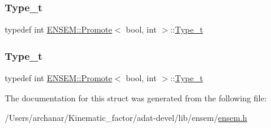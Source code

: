 \subsubsection{\texorpdfstring{Type\_t}{Type\_t}\hspace{0.1cm}{\footnotesize\ttfamily [2/3]}}
{\footnotesize\ttfamily typedef int \mbox{\hyperlink{structENSEM_1_1Promote}{E\+N\+S\+E\+M\+::\+Promote}}$<$ bool, int $>$\+::\mbox{\hyperlink{structENSEM_1_1Promote_3_01bool_00_01int_01_4_a99e4da6ec7e0f07a99dc32a1da962371}{Type\+\_\+t}}}

\mbox{\label{structENSEM_1_1Promote_3_01bool_00_01int_01_4_a99e4da6ec7e0f07a99dc32a1da962371}} 
\subsubsection{\texorpdfstring{Type\_t}{Type\_t}\hspace{0.1cm}{\footnotesize\ttfamily [3/3]}}
{\footnotesize\ttfamily typedef int \mbox{\hyperlink{structENSEM_1_1Promote}{E\+N\+S\+E\+M\+::\+Promote}}$<$ bool, int $>$\+::\mbox{\hyperlink{structENSEM_1_1Promote_3_01bool_00_01int_01_4_a99e4da6ec7e0f07a99dc32a1da962371}{Type\+\_\+t}}}



The documentation for this struct was generated from the following file\+:\begin{DoxyCompactItemize}
\item 
/\+Users/archanar/\+Kinematic\+\_\+factor/adat-\/devel/lib/ensem/\mbox{\hyperlink{adat-devel_2lib_2ensem_2ensem_8h}{ensem.\+h}}\end{DoxyCompactItemize}
